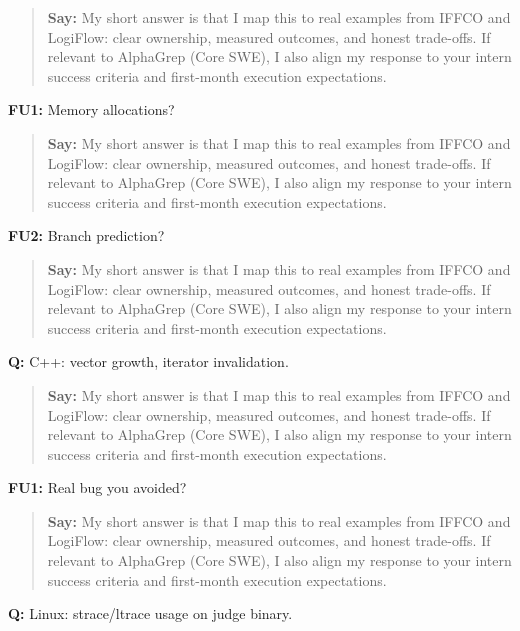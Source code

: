 \documentclass[9pt,a4paper]{article}
\begin{document}
\begin{quote}\small\textbf{Say:} My short answer is that I map this to real examples from IFFCO and LogiFlow: clear ownership, measured outcomes, and honest trade-offs. If relevant to AlphaGrep (Core SWE), I also align my response to your intern success criteria and first-month execution expectations.\end{quote}
\vspace{2mm}
\textbf{FU1:} Memory allocations?

\begin{quote}\small\textbf{Say:} My short answer is that I map this to real examples from IFFCO and LogiFlow: clear ownership, measured outcomes, and honest trade-offs. If relevant to AlphaGrep (Core SWE), I also align my response to your intern success criteria and first-month execution expectations.\end{quote}
\vspace{2mm}
\textbf{FU2:} Branch prediction?

\begin{quote}\small\textbf{Say:} My short answer is that I map this to real examples from IFFCO and LogiFlow: clear ownership, measured outcomes, and honest trade-offs. If relevant to AlphaGrep (Core SWE), I also align my response to your intern success criteria and first-month execution expectations.\end{quote}
\vspace{2mm}
\textbf{Q:} C++: vector growth, iterator invalidation.

\begin{quote}\small\textbf{Say:} My short answer is that I map this to real examples from IFFCO and LogiFlow: clear ownership, measured outcomes, and honest trade-offs. If relevant to AlphaGrep (Core SWE), I also align my response to your intern success criteria and first-month execution expectations.\end{quote}
\vspace{2mm}
\textbf{FU1:} Real bug you avoided?

\begin{quote}\small\textbf{Say:} My short answer is that I map this to real examples from IFFCO and LogiFlow: clear ownership, measured outcomes, and honest trade-offs. If relevant to AlphaGrep (Core SWE), I also align my response to your intern success criteria and first-month execution expectations.\end{quote}
\vspace{2mm}
\textbf{Q:} Linux: strace/ltrace usage on judge binary.
\end{document}
